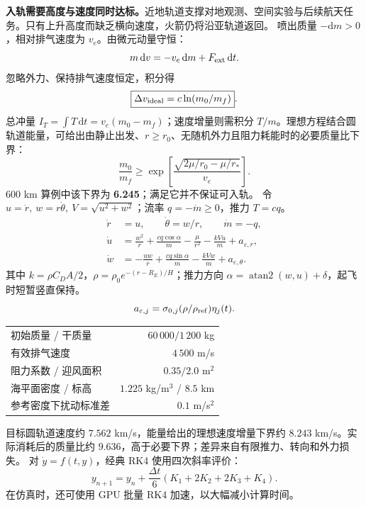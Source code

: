 \documentclass[UTF8,fontset=fandol,10pt]{ctexart}
\begin{document}
\fontsize{10}{13}\selectfont
{}
\columnstart
{}
\textbf{入轨需要高度与速度同时达标。}近地轨道支撑对地观测、空间实验与后续航天任务。只有上升高度而缺乏横向速度，火箭仍将沿亚轨道返回。
喷出质量 $-\mathrm dm>0$，相对排气速度为 $v_e$。由微元动量守恒：
\[
 m\,\mathrm dv=-v_e\,\mathrm dm+F_{\rm ext}\,\mathrm dt.
\]
忽略外力、保持排气速度恒定，积分得
\[
 \boxed{\Delta v_{\rm ideal}=c\ln(m_0/m_f)}.
\]
总冲量 $I_T=\int T\,\mathrm dt=v_e(m_0-m_f)$；速度增量则需积分 $T/m$。理想方程结合圆轨道能量，可给出由静止出发、$r\ge r_0$、无随机外力且阻力耗能时的必要质量比下界：
\[
 \frac{m_0}{m_f}\ge\exp\!\left[\frac{\sqrt{2\mu/r_0-\mu/r_*}}{v_e}\right].
\]
600 km 算例中该下界为 \textbf{6.245}；满足它并不保证可入轨。
令 $u=\dot r,\ w=r\dot\theta,\ V=\sqrt{u^2+w^2}$；流率 $q=-\dot m\ge0$，推力 $T=cq$。
\[
\begin{aligned}
 \dot r&=u,\qquad \dot\theta=w/r,\qquad \dot m=-q,\\
 \dot u&=\frac{w^2}{r}+\frac{cq\cos\alpha}{m}-\frac{\mu}{r^2}
 -\frac{kVu}{m}+a_{\varepsilon,r},\\
 \dot w&=-\frac{uw}{r}+\frac{cq\sin\alpha}{m}
 -\frac{kVw}{m}+a_{\varepsilon,\theta}.
\end{aligned}
\]
其中 $k=\rho C_DA/2$，$\rho=\rho_0e^{-(r-R_E)/H}$；推力方向 $\alpha=\operatorname{atan2}(w,u)+\delta$，起飞时短暂竖直保持。
\[
 a_{\varepsilon,j}=\sigma_{0,j}(\rho/\rho_{\rm ref})\eta_j(t).
\]

{\fontsize{9.2}{12}\selectfont
\begin{tabular*}{\linewidth}{@{\extracolsep{\fill}}lr@{}}\toprule
初始质量 / 干质量 & $60\,000 / 1\,200$ kg\\
有效排气速度 & $4\,500$ m/s\\
阻力系数 / 迎风面积 & $0.35 / 2.0$ m$^2$\\
海平面密度 / 标高 & $1.225$ kg/m$^3$ / $8.5$ km\\
参考密度下扰动标准差 & $0.1$ m/s$^2$\\\bottomrule
\end{tabular*}}
目标圆轨道速度约 $7.562$ km/s，能量给出的理想速度增量下界约 $8.243$ km/s。实际消耗后的质量比约 $9.636$，高于必要下界；差异来自有限推力、转向和外力损失。
对 $\dot y=f(t,y)$，经典 RK4 使用四次斜率评价：
\[
 y_{n+1}=y_n+\frac{\Delta t}{6}(K_1+2K_2+2K_3+K_4).
\]
在仿真时，还可使用 GPU 批量 RK4 加速，以大幅减小计算时间。
\end{document}
